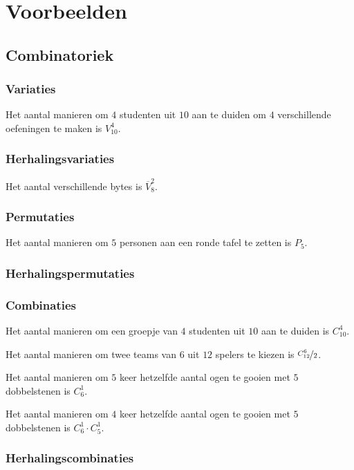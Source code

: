 \documentclass[main.tex]{subfiles}
\begin{document}
\chapter{Voorbeelden}
\label{cha:voorbeelden}



\section{Combinatoriek}
\subsection*{Variaties}
\begin{vb}
  Het aantal manieren om $4$ studenten uit $10$ aan te duiden om $4$ verschillende oefeningen te maken is $V_{10}^{4}$.
\end{vb}

\subsection*{Herhalingsvariaties}
\begin{vb}
  Het aantal verschillende bytes is $\overline{V}_{8}^{2}$.
\end{vb}

\subsection*{Permutaties}
\begin{vb}
  Het aantal manieren om $5$ personen aan een ronde tafel te zetten is $P_{5}$.
\end{vb}

\subsection*{Herhalingspermutaties}

\subsection*{Combinaties}
\begin{vb}  
  Het aantal manieren om een groepje van $4$ studenten uit $10$ aan te duiden is $C^{4}_{10}$.
\end{vb}

\begin{vb}
  Het aantal manieren om twee teams van $6$ uit $12$ spelers te kiezen is $\nicefrac{C^{6}_{12}}{2}$.
\end{vb}

\begin{vb}
  Het aantal manieren om $5$ keer hetzelfde aantal ogen te gooien met $5$ dobbelstenen is $C_{6}^{1}$.
\end{vb}

\begin{vb}
  Het aantal manieren om $4$ keer hetzelfde aantal ogen te gooien met $5$ dobbelstenen is $C_{6}^{1}\cdot C_{5}^{1}$.
\end{vb}

\subsection*{Herhalingscombinaties}
\end{document}

